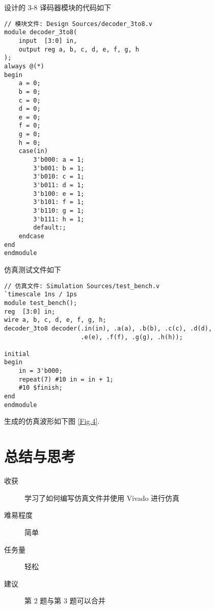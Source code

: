 \documentclass[UTF8,fontset=fandol]{ctexart}
\begin{document}
\begin{ExQuestions}
    \question 设计的 3-8 译码器模块的代码如下
    \begin{lstlisting}[style=verilogstyle, caption={3-8 译码器模块}, label={Code.4}]
// 模块文件: Design Sources/decoder_3to8.v
module decoder_3to8(
    input  [3:0] in,
    output reg a, b, c, d, e, f, g, h
);
always @(*) 
begin
    a = 0;
    b = 0;
    c = 0;
    d = 0;
    e = 0;
    f = 0;
    g = 0;
    h = 0;
    case(in)
        3'b000: a = 1;
        3'b001: b = 1;
        3'b010: c = 1;
        3'b011: d = 1;
        3'b100: e = 1;
        3'b101: f = 1;
        3'b110: g = 1;
        3'b111: h = 1;
        default:;
    endcase
end
endmodule
    \end{lstlisting}
    仿真测试文件如下
    \begin{lstlisting}[style=verilogstyle, caption={题目 4 仿真测试文件}, label={Code.5}]
// 仿真文件: Simulation Sources/test_bench.v
`timescale 1ns / 1ps
module test_bench();
reg  [3:0] in;
wire a, b, c, d, e, f, g, h;
decoder_3to8 decoder(.in(in), .a(a), .b(b), .c(c), .d(d),
                     .e(e), .f(f), .g(g), .h(h));

initial 
begin
    in = 3'b000;
    repeat(7) #10 in = in + 1;
    #10 $finish;
end
endmodule
    \end{lstlisting}
    生成的仿真波形如下图 \ref{Fig.4}.
\end{ExQuestions}
\section*{总结与思考}
\begin{description}
    \item[收获] 学习了如何编写仿真文件并使用 Vivado 进行仿真
    \item[难易程度] 简单
    \item[任务量] 轻松
    \item[建议] 第 2 题与第 3 题可以合并 
\end{description}
\end{document}
